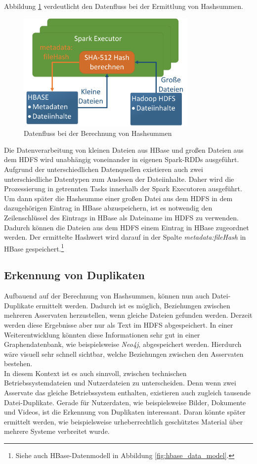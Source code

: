 \noindent
Abbildung \ref{fig:data_processing_hashes} verdeutlicht den Datenfluss bei der Ermittlung von Hashsummen.
\begin{figure}[ht]
  \centering
  \includegraphics[width=0.78\textwidth]{./resource/spark_processing_hashes.png}
  \caption{Datenfluss bei der Berechnung von Hashsummen}
  \label{fig:data_processing_hashes}
\end{figure}

\noindent
Die Datenverarbeitung von kleinen Dateien aus HBase und großen Dateien aus dem HDFS wird unabhängig voneinander in eigenen Spark-RDDs ausgeführt. Aufgrund der unterschiedlichen Datenquellen existieren auch zwei unterschiedliche Datentypen zum Auslesen der Dateiinhalte. Daher wird die Prozessierung in getrennten Tasks innerhalb der Spark Executoren ausgeführt. Um dann später die Hashsumme einer großen Datei aus dem HDFS in dem dazugehörigen Eintrag in HBase abzuspeichern, ist es notwendig den Zeilenschlüssel des Eintrags in HBase als Dateiname im HDFS zu verwenden. Dadurch können die Dateien aus dem HDFS einem Eintrag in HBase zugeordnet werden. Der ermittelte Hashwert wird darauf in der Spalte \textit{metadata:fileHash} in HBase  gespeichert.\footnote{Siehe auch HBase-Datenmodell in Abbildung \ref{fig:hbase_data_model}.}

\subsection{Erkennung von Duplikaten}
\label{subsec:duplicate_files}
Aufbauend auf der Berechnung von Hashsummen, können nun auch Datei-Duplikate ermittelt werden. Dadurch ist es möglich, Beziehungen zwischen mehreren Asservaten herzustellen, wenn gleiche Dateien gefunden werden.
Derzeit werden diese Ergebnisse aber nur als Text im HDFS abgespeichert. In einer Weiterentwicklung könnten diese Informationen sehr gut in einer Graphendatenbank, wie beispielsweise \textit{Neo4j}, abgespeichert werden. Hierdurch wäre visuell sehr schnell sichtbar, welche Beziehungen zwischen den Asservaten bestehen.\\ 
In diesem Kontext ist es auch sinnvoll, zwischen technischen Betriebssystemdateien und Nutzerdateien zu unterscheiden. Denn wenn zwei Asservate das gleiche Betriebssystem enthalten, existieren auch zugleich tausende Datei-Duplikate. Gerade für Nutzerdaten, wie beispielsweise Bilder, Dokumente und Videos, ist die Erkennung von Duplikaten interessant. Daran könnte später ermittelt werden, wie beispielsweise urheberrechtlich geschütztes Material über mehrere Systeme verbreitet wurde.\\

